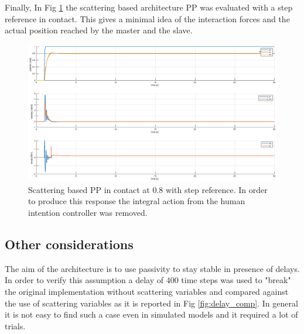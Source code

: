 \documentclass[a4paper,12pt]{article}
\begin{document}
Finally, In Fig \ref{fig:scatt_pp_step} the scattering based architecture PP was evaluated with a step reference in contact. This gives a minimal idea of the interaction forces and the actual position reached by the master and the slave.

\begin{figure}[H]
    \begin{center}
        \hspace*{-4.5cm}
        \includegraphics[scale=0.5]{images/scatt_pp_step.eps}
    \end{center}
    \caption{Scattering based PP in contact at 0.8 with step reference. In order to produce this response the integral action from the human intention controller was removed.}
    \label{fig:scatt_pp_step}
\end{figure}

\subsection{Other considerations}

The aim of the architecture is to use passivity to stay stable in presence of delays. In order to verify this assumption a delay of $400$ time steps was used to "break" the original implementation without scattering variables and compared against the use of scattering variables as it is reported in Fig \ref{fig:delay_comp}. In general it is not easy to find such a case even in simulated models and it required a lot of trials.
\end{document}
